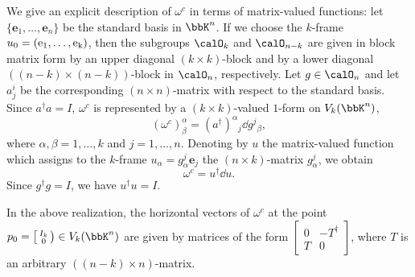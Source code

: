 \begin{example}
    We give an explicit description of $\omega^c$ in terms of matrix-valued functions: let $\{\bm{e}_1,\ldots,\bm{e}_n\}$ be the standard basis in $\bbK^n$. If we choose the $k$-frame $u_0=(\rm{e}_1,\ldots,\rm{e}_k)$, then the subgroups $\calO_k$ and $\calO_{n-k}$ are given in block matrix form by an upper diagonal $(k\times k)$-block and by a lower diagonal $((n-k)\times(n-k))$-block in $\calO_n$, respectively. Let $g\in\calO_n$ and let $a^i_j$ be the corresponding $(n\times n)$-matrix with respect to the standard basis. Since $a^\dagger a=I$, $\omega^c$ is represented by a $(k\times k)$-valued $1$-form on $V_k(\bbK^n)$,
    \[(\omega^c)^\alpha_\beta=(a^\dagger)^\alpha{}_j \dd g^j{}_\beta,\]
    where $\alpha,\beta=1,\ldots,k$ and $j=1,\ldots,n$. Denoting by $u$ the matrix-valued function which assigns to the $k$-frame $u_\alpha=g^j_\alpha \bm{e}_j$ the $(n\times k)$-matrix $g^j_\alpha$, we obtain
    \[\omega^c=u^\dagger\dd u.\]
    Since $g^\dagger g=I$, we have $u^\dagger u=I$.
\end{example}

\begin{rem}
    In the above realization, the horizontal vectors of $\omega^c$ at the point $p_0=\left[\begin{smallmatrix}
        I_k\\0
    \end{smallmatrix}\right)\in V_k(\bbK^n)$
    are given by matrices of the form $\left[\begin{smallmatrix}
        0&-T^\dagger\\
        T&0
    \end{smallmatrix}\right]$,
    where $T$ is an arbitrary $((n-k)\times n)$-matrix.
\end{rem}

